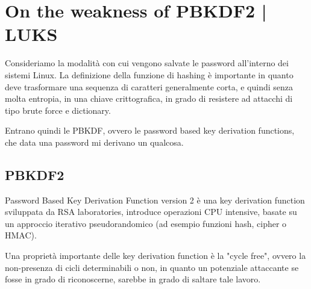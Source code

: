 \documentclass[11pt, oneside]{article}   	%
\begin{document}
\section*{On the weakness of PBKDF2 | LUKS}
Consideriamo la modalità con cui vengono salvate le password all'interno dei sistemi Linux. La definizione della funzione di hashing è importante in quanto deve trasformare una sequenza di caratteri generalmente corta, e quindi senza molta entropia, in una chiave crittografica, in grado di resistere ad attacchi di tipo brute force e dictionary. 

Entrano quindi le PBKDF, ovvero le password based key derivation functions, che data una password mi derivano un qualcosa.

\subsection*{PBKDF2}
Password Based Key Derivation Function version 2 è una key derivation function sviluppata da RSA laboratories, introduce operazioni CPU intensive, basate su un approccio iterativo pseudorandomico (ad esempio funzioni hash, cipher o HMAC).  

Una proprietà importante delle key derivation function è la "cycle free", ovvero la non-presenza di cicli determinabili o non, in quanto un potenziale attaccante se fosse in grado di riconoscerne, sarebbe in grado di saltare tale lavoro.
\end{document}
